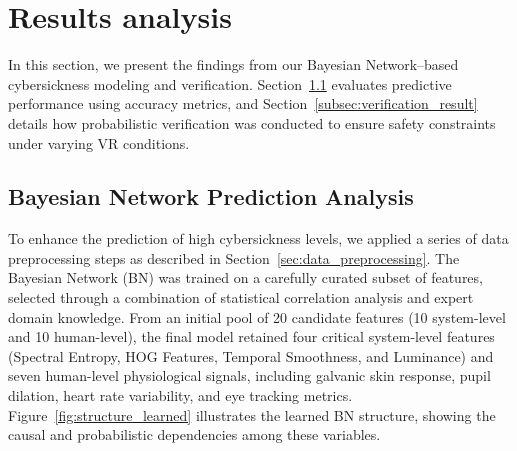 \documentclass{vgtc}                          %
\begin{document}


\section{Results analysis}
In this section, we present the findings from our Bayesian Network–based cybersickness modeling and verification. Section~\ref{subsec:BNpredict} evaluates predictive performance using accuracy metrics, and Section~\ref{subsec:verification_result} details how probabilistic verification was conducted to ensure safety constraints under varying VR conditions.

\subsection{Bayesian Network Prediction Analysis}
\label{subsec:BNpredict}
To enhance the prediction of high cybersickness levels, we applied a series of data preprocessing steps as described in Section~\ref{sec:data_preprocessing}. The Bayesian Network (BN) was trained on a carefully curated subset of features, selected through a combination of statistical correlation analysis and expert domain knowledge. From an initial pool of 20 candidate features (10 system-level and 10 human-level), the final model retained four critical system-level features (Spectral Entropy, HOG Features, Temporal Smoothness, and Luminance) and seven human-level physiological signals, including galvanic skin response, pupil dilation, heart rate variability, and eye tracking metrics. Figure~\ref{fig:structure_learned} illustrates the learned BN structure, showing the causal and probabilistic dependencies among these variables.
\end{document}
